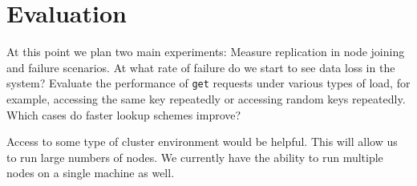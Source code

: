 \documentclass[12pt]{article}
\begin{document}
\section{Evaluation}

At this point we plan two main experiments: Measure replication in node joining and failure scenarios. At what rate of failure do we start to see data loss in the system? Evaluate the performance of {\tt get} requests under various types of load, for example, accessing the same key repeatedly or accessing random keys repeatedly. Which cases do faster lookup schemes improve? 

Access to some type of cluster environment would be helpful. This will allow us to run large numbers of nodes. We currently have the ability to run multiple nodes on a single machine as well.
\end{document}
